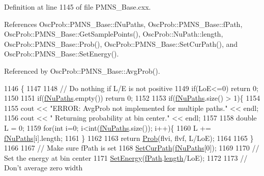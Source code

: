 Definition at line 1145 of file P\+M\+N\+S\+\_\+\+Base.\+cxx.



References Osc\+Prob\+::\+P\+M\+N\+S\+\_\+\+Base\+::f\+Nu\+Paths, Osc\+Prob\+::\+P\+M\+N\+S\+\_\+\+Base\+::f\+Path, Osc\+Prob\+::\+P\+M\+N\+S\+\_\+\+Base\+::\+Get\+Sample\+Points(), Osc\+Prob\+::\+Nu\+Path\+::length, Osc\+Prob\+::\+P\+M\+N\+S\+\_\+\+Base\+::\+Prob(), Osc\+Prob\+::\+P\+M\+N\+S\+\_\+\+Base\+::\+Set\+Cur\+Path(), and Osc\+Prob\+::\+P\+M\+N\+S\+\_\+\+Base\+::\+Set\+Energy().



Referenced by Osc\+Prob\+::\+P\+M\+N\+S\+\_\+\+Base\+::\+Avg\+Prob().


\begin{DoxyCode}
1146 \{
1147 
1148   \textcolor{comment}{// Do nothing if L/E is not positive}
1149   \textcolor{keywordflow}{if}(LoE<=0) \textcolor{keywordflow}{return} 0;
1150 
1151   \textcolor{keywordflow}{if}(\hyperlink{classOscProb_1_1PMNS__Base_a69db9d57e12fc7cbe0431bc6c18fac93}{fNuPaths}.empty()) \textcolor{keywordflow}{return} 0;
1152 
1153   \textcolor{keywordflow}{if}(\hyperlink{classOscProb_1_1PMNS__Base_a69db9d57e12fc7cbe0431bc6c18fac93}{fNuPaths}.size() > 1)\{
1154 
1155     cout << \textcolor{stringliteral}{"ERROR: AvgProb not implemented for multiple paths."} << endl;
1156     cout << \textcolor{stringliteral}{"       Returning probability at bin center."} << endl;
1157 
1158     \textcolor{keywordtype}{double} L = 0;
1159     \textcolor{keywordflow}{for}(\textcolor{keywordtype}{int} i=0; i<int(\hyperlink{classOscProb_1_1PMNS__Base_a69db9d57e12fc7cbe0431bc6c18fac93}{fNuPaths}.size()); i++)\{
1160       L += \hyperlink{classOscProb_1_1PMNS__Base_a69db9d57e12fc7cbe0431bc6c18fac93}{fNuPaths}[i].length;
1161     \}
1162 
1163     \textcolor{keywordflow}{return} \hyperlink{classOscProb_1_1PMNS__Base_aec5c399b93261f1962a4b7dbbb44b973}{Prob}(flvi, flvf, L/LoE);
1164 
1165   \}
1166 
1167   \textcolor{comment}{// Make sure fPath is set}
1168   \hyperlink{classOscProb_1_1PMNS__Base_a986e6ebef09a7e2eb7fee16a4c2c834d}{SetCurPath}(\hyperlink{classOscProb_1_1PMNS__Base_a69db9d57e12fc7cbe0431bc6c18fac93}{fNuPaths}[0]);
1169 
1170   \textcolor{comment}{// Set the energy at bin center}
1171   \hyperlink{classOscProb_1_1PMNS__Base_a95b3b0d0cab5e6a54b5ef99587f837c0}{SetEnergy}(\hyperlink{classOscProb_1_1PMNS__Base_a849437aa8891fe042e86886ce8f81c6e}{fPath}.\hyperlink{structOscProb_1_1NuPath_af22660894b6e25cf835500381b155557}{length}/LoE);
1172 
1173   \textcolor{comment}{// Don't average zero width}

\end{DoxyCode}
